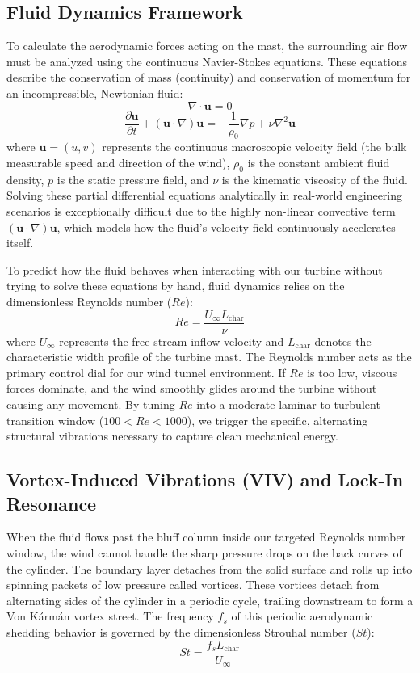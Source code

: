 \documentclass[11pt,a4paper]{article}
\begin{document}
\subsection{Fluid Dynamics Framework}
To calculate the aerodynamic forces acting on the mast, the surrounding air flow must be analyzed using the continuous Navier-Stokes equations. These equations describe the conservation of mass (continuity) and conservation of momentum for an incompressible, Newtonian fluid:
\begin{equation}
\nabla \cdot \mathbf{u} = 0
\end{equation}
\begin{equation}
\frac{\partial \mathbf{u}}{\partial t} + (\mathbf{u} \cdot \nabla)\mathbf{u} = -\frac{1}{\rho_0}\nabla p + \nu \nabla^2 \mathbf{u}
\end{equation}
where $\mathbf{u} = (u, v)$ represents the continuous macroscopic velocity field (the bulk measurable speed and direction of the wind), $\rho_0$ is the constant ambient fluid density, $p$ is the static pressure field, and $\nu$ is the kinematic viscosity of the fluid. Solving these partial differential equations analytically in real-world engineering scenarios is exceptionally difficult due to the highly non-linear convective term $(\mathbf{u} \cdot \nabla)\mathbf{u}$, which models how the fluid's velocity field continuously accelerates itself.

To predict how the fluid behaves when interacting with our turbine without trying to solve these equations by hand, fluid dynamics relies on the dimensionless Reynolds number ($Re$):
\begin{equation}
Re = \frac{U_{\infty} L_{\text{char}}}{\nu}
\end{equation}
where $U_{\infty}$ represents the free-stream inflow velocity and $L_{\text{char}}$ denotes the characteristic width profile of the turbine mast. The Reynolds number acts as the primary control dial for our wind tunnel environment. If $Re$ is too low, viscous forces dominate, and the wind smoothly glides around the turbine without causing any movement. By tuning $Re$ into a moderate laminar-to-turbulent transition window ($100 < Re < 1000$), we trigger the specific, alternating structural vibrations necessary to capture clean mechanical energy.

\subsection{Vortex-Induced Vibrations (VIV) and Lock-In Resonance}
When the fluid flows past the bluff column inside our targeted Reynolds number window, the wind cannot handle the sharp pressure drops on the back curves of the cylinder. The boundary layer detaches from the solid surface and rolls up into spinning packets of low pressure called vortices. These vortices detach from alternating sides of the cylinder in a periodic cycle, trailing downstream to form a Von Kármán vortex street. The frequency $f_s$ of this periodic aerodynamic shedding behavior is governed by the dimensionless Strouhal number ($St$):
\begin{equation}
St = \frac{f_s L_{\text{char}}}{U_{\infty}}
\end{equation}
\end{document}
